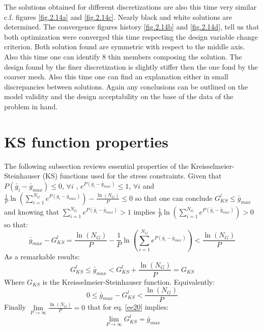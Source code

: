     The solutions obtained for different discretizations are also this time very similar c.f. figures \ref{fig.2.14a} and \ref{fig.2.14c}. Nearly black and white solutions are determined. The convergence figures history \ref{fig.2.14b} and \ref{fig.2.14d}, tell us that both optimization were converged this time respecting the design variable change criterion. Both solution found are symmetric with respect to the middle axis. Also this time one can identify 8 thin members composing the solution. The design found by the finer discretization is slightly stiffer then the one fond by the coarser mesh. Also this time one can find an explanation either in small discrepancies between solutions. Again any conclusions can be outlined on the model validity and the design acceptability on the base of the data of the problem in hand.
     \clearpage
\section{KS function properties}
\label{Appendix1}
The following subsection reviews essential properties of the Kreisselmeier-Steinhauser (KS) functions used for the stress constraints.
Given that $P\left(\bar{g}_i-\bar{g}_{max}\right)\leq 0$, $\forall i$ , $e^{P\left(\bar{g}_i-\bar{g}_{max}\right)}\leq 1$, $\forall i$ and $\frac{1}{P}\ln\left(\sum_{i=1}^{N_G}e^{P\left(\bar{g}_i-\bar{g}_{max}\right)}\right)-\frac{\ln\left(N_G\right)}{P}\leq 0$ so that one can conclude $G^{l}_{KS}\leq \bar{g}_{max}$ and knowing that  $\sum_{i=1}^{N_G}e^{P\left(\bar{g}_i-\bar{g}_{max}\right)}>1$ implies $\frac{1}{P}\ln\left(\sum_{i=1}^{N_G}e^{P\left(\bar{g}_i-\bar{g}_{max}\right)}\right)>0$ so that:
\begin{equation}
\label{eq.NGP}
\bar{g}_{max}-G^{l}_{KS}=\frac{\ln\left(N_G\right)}{P}-\frac{1}{P}\ln\left(\sum_{i=1}^{N_G}e^{P\left(\bar{g}_i-\bar{g}_{max}\right)}\right)< \frac{\ln\left(N_G\right)}{P}
\end{equation}
As a remarkable results:
 \begin{equation}
 G^{l}_{KS}\leq\bar{g}_{max}<G^{l}_{KS}+\frac{\ln\left(N_G\right)}{P}=G_{KS}
 \end{equation}
 Where $G_{KS}$ is the Kreisselmeier-Steinhauser function.
Equivalently:
  \begin{equation}
  \label{ee20}
  0\leq\bar{g}_{max}-G^{l}_{KS}<\frac{\ln\left(N_G\right)}{P}
  \end{equation} 
Finally $\lim\limits_{P\rightarrow \infty}\frac{\ln\left(N_G\right)}{P}=0$
that for eq. \ref{ee20} implies:
\begin{equation}
\lim\limits_{P\rightarrow \infty}G^{l}_{KS}=\bar{g}_{max}
\end{equation}
